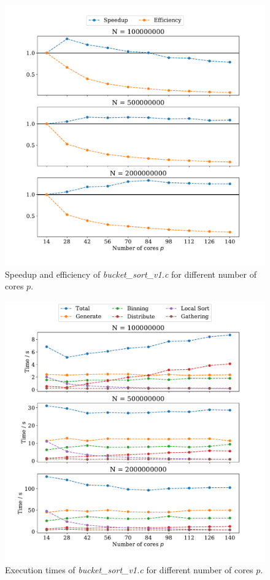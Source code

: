 \documentclass[a4paper, 11pt]{article}
\begin{document}
\begin{figure}
  \centering
  \includegraphics[width=\textwidth]{../part_1/plot/v1_speedup.pdf}
  \caption{Speedup and efficiency of \textit{bucket\_sort\_v1.c} for different
    number of cores $p$.}
  \label{fig:p1_v1_speedup}
\end{figure}
\begin{figure}
  \centering
  \includegraphics[width=\textwidth]{../part_1/plot/v1_times.pdf}
  \caption{Execution times of \textit{bucket\_sort\_v1.c} for different number
  of cores $p$.}
  \label{fig:p1_v1_times}
\end{figure}
\end{document}
